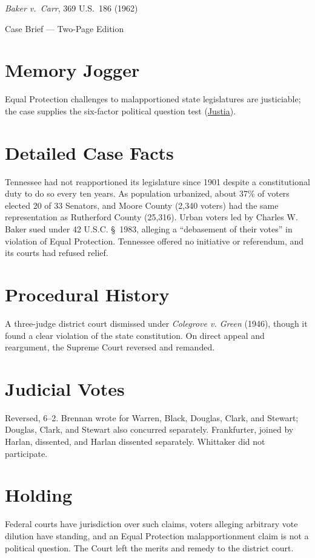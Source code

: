 \documentclass[12pt]{article}
\begin{document}
\begin{center}
{\LARGE \textit{Baker v.\ Carr}, 369 U.S.\ 186 (1962)\par}
\vspace{0.5em}
{\large Case Brief --- Two-Page Edition\par}
\end{center}

\section{Memory Jogger}
Equal Protection challenges to malapportioned state legislatures are justiciable; the case supplies the six-factor political question test (\href{https://supreme.justia.com/cases/federal/us/369/186/}{Justia}).

\section{Detailed Case Facts}
Tennessee had not reapportioned its legislature since 1901 despite a constitutional duty to do so every ten years. As population urbanized, about 37\% of voters elected 20 of 33 Senators, and Moore County (2,340 voters) had the same representation as Rutherford County (25,316). Urban voters led by Charles W. Baker sued under 42 U.S.C. \S~1983, alleging a ``debasement of their votes'' in violation of Equal Protection. Tennessee offered no initiative or referendum, and its courts had refused relief.

\section{Procedural History}
A three-judge district court dismissed under \textit{Colegrove v. Green} (1946), though it found a clear violation of the state constitution. On direct appeal and reargument, the Supreme Court reversed and remanded.

\section{Judicial Votes}
Reversed, 6--2. Brennan wrote for Warren, Black, Douglas, Clark, and Stewart; Douglas, Clark, and Stewart also concurred separately. Frankfurter, joined by Harlan, dissented, and Harlan dissented separately. Whittaker did not participate.

\section{Holding}
Federal courts have jurisdiction over such claims, voters alleging arbitrary vote dilution have standing, and an Equal Protection malapportionment claim is not a political question. The Court left the merits and remedy to the district court.
\end{document}
